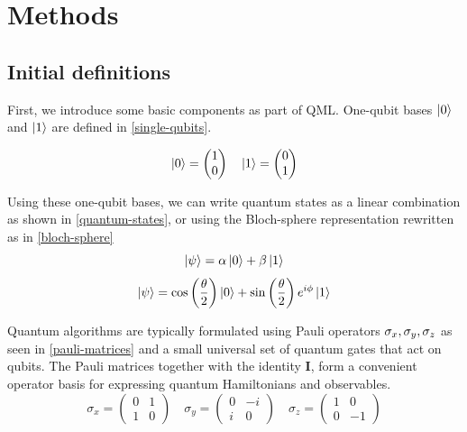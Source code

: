 \section{Methods}\label{section:methods}

\subsection{Initial definitions}

First, we introduce some basic components as part of QML. One-qubit bases $\left| 0 \right\rangle$ and $\left| 1 \right\rangle$ are defined in \cref{single-qubits}.

\begin{equation}\label{single-qubits}
    \left| 0 \right\rangle = \begin{pmatrix}
        1\\0
    \end{pmatrix}\quad
    \left| 1 \right\rangle = \begin{pmatrix}
        0\\1
    \end{pmatrix}
\end{equation}

Using these one-qubit bases, we can write quantum states as a linear combination as shown in \cref{quantum-states}, or using the Bloch-sphere representation rewritten as in \cref{bloch-sphere}
\begin{equation}\label{quantum-states}
    \left| \psi \right\rangle = \alpha\left| 0 \right\rangle+\beta\left| 1 \right\rangle
\end{equation}
\begin{equation}\label{bloch-sphere}
    \left| \psi \right\rangle=\cos\left(\frac{\theta}{2}\right)\left| 0 \right\rangle+\sin\left(\frac{\theta}{2}\right)e^{i\phi}\left| 1 \right\rangle
\end{equation}

Quantum algorithms are typically formulated using Pauli operators $\sigma_x,\space\sigma_y,\space\sigma_z$ as seen in \cref{pauli-matrices} and a small universal set of quantum gates that act on qubits. The Pauli matrices together with the identity $\textbf{I}$, form a convenient operator basis for expressing quantum Hamiltonians and observables. 
\begin{equation}\label{pauli-matrices}
    \sigma_x=\begin{pmatrix}
        0&1\\1&0
    \end{pmatrix}\quad
    \sigma_y=\begin{pmatrix}
        0&-i\\i&0
    \end{pmatrix}\quad
    \sigma_z=\begin{pmatrix}
        1&0\\0&-1
    \end{pmatrix}
\end{equation}

